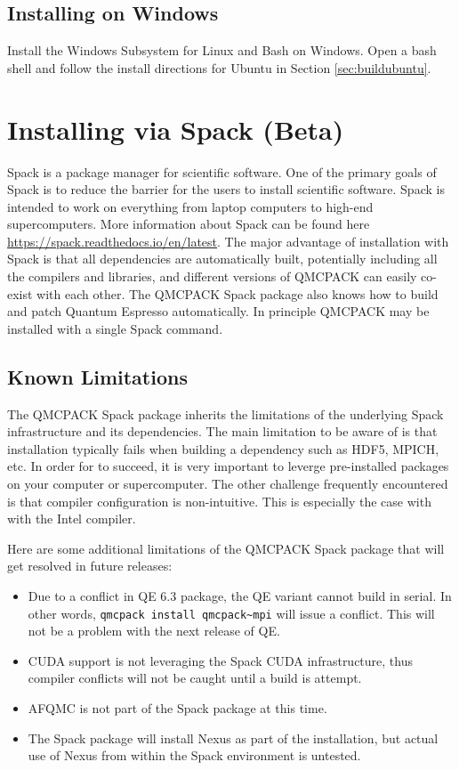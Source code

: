 \subsection{Installing on Windows}
Install the Windows Subsystem for Linux and Bash on Windows.
Open a bash shell and follow the install directions for Ubuntu in Section \ref{sec:buildubuntu}.

\section{Installing via Spack (Beta)}
Spack is a package manager for scientific software.
One of the primary goals of Spack is to reduce the barrier for the users to install scientific
software. Spack is intended to work on everything from laptop
computers to high-end supercomputers. More information about Spack can
be found here \url{https://spack.readthedocs.io/en/latest}. The major
advantage of installation with Spack is that all dependencies are
automatically built, potentially including all the compilers and libraries, and
different versions of QMCPACK can easily co-exist with each other.
The QMCPACK Spack package also knows how to build
and patch Quantum Espresso automatically. In principle QMCPACK may be installed with
a single Spack command.

\subsection{Known Limitations}

The QMCPACK Spack package inherits the limitations of the underlying
Spack infrastructure and its dependencies. The main limitation to be
aware of is that installation typically fails when building a
dependency such as HDF5, MPICH, etc. In order for
 to succeed, it is very important to
leverge pre-installed packages on your computer or supercomputer. The
other challenge frequently encountered is that compiler configuration
is non-intuitive.  This is especially the case with with the Intel
compiler.

Here are some additional limitations of the QMCPACK Spack package that
will get resolved in future releases:
\begin{itemize}
\item Due to a conflict in QE 6.3 package, the QE variant cannot build
  in serial. In other words, \verb|qmcpack install qmcpack~mpi| will issue
  a conflict.  This will not be a problem with the next release of QE.
\item CUDA support is not leveraging the Spack CUDA infrastructure,
  thus compiler conflicts will not be caught until a build is attempt.
\item AFQMC is not part of the Spack package at this time.
\item The Spack package will install Nexus as part of the
  installation, but actual use of Nexus from within the Spack
  environment is untested.
\end{itemize}

